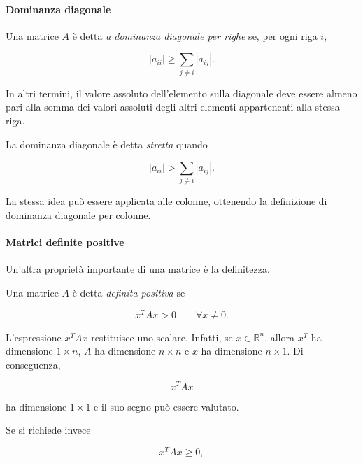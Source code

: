 \paragraph{Dominanza diagonale}
Una matrice $A$ è detta \emph{a dominanza diagonale per righe} se,
per ogni riga $i$,

\begin{equation*}
    |a_{ii}|
    \geq
    \sum_{j\neq i}|a_{ij}|.
    \label{eq:diagonal-dominance}
\end{equation*}

In altri termini, il valore assoluto dell'elemento sulla diagonale
deve essere almeno pari alla somma dei valori assoluti degli altri
elementi appartenenti alla stessa riga.

La dominanza diagonale è detta \emph{stretta} quando

\begin{equation*}
    |a_{ii}|
    >
    \sum_{j\neq i}|a_{ij}|.
    \label{eq:strict-diagonal-dominance}
\end{equation*}

La stessa idea può essere applicata alle colonne, ottenendo la
definizione di dominanza diagonale per colonne.


\paragraph{Matrici definite positive}

Un'altra proprietà importante di una matrice è la definitezza.

Una matrice $A$ è detta \emph{definita positiva} se

\begin{equation*}
    x^T A x>0
    \qquad
    \forall x\neq 0.
    \label{eq:positive-definite}
\end{equation*}

L'espressione $x^TAx$ restituisce uno scalare. Infatti, se
$x\in\mathbb{R}^{n}$, allora $x^T$ ha dimensione $1\times n$,
$A$ ha dimensione $n\times n$ e $x$ ha dimensione $n\times1$.
Di conseguenza,

\begin{equation*}
    x^TAx
\end{equation*}

ha dimensione $1\times1$ e il suo segno può essere valutato.

Se si richiede invece

\begin{equation*}
    x^TAx\geq0,
\end{equation*}

